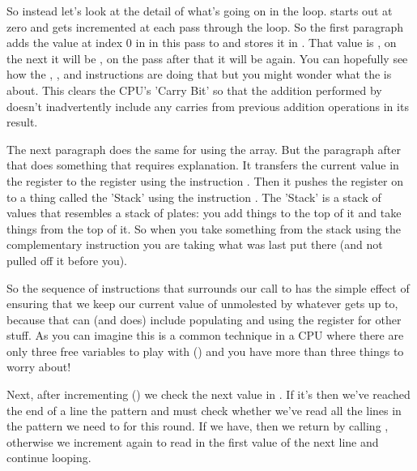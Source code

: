So instead let's look at the detail of what's going on in the loop.  starts out at zero and gets incremented at
each pass through the loop. So the first paragraph adds the value at index 0 in  in this pass to 
and stores it in . That value is , on the next it will be , on the pass after that
it will be  again. You can hopefully see how the , , and  instructions are doing that
but you might wonder what the  is about. This clears the CPU's 'Carry Bit' so that the addition performed by 
doesn't inadvertently include any carries from previous addition operations in its result.

The next paragraph does the same for  using the  array. But the paragraph after
that does something that requires explanation. It transfers the current value in the  register to the  register
using the instruction . Then it pushes the  register on to a thing called the 'Stack' using the instruction
. The 'Stack' is a stack of values that resembles a stack of plates: you add things to the top of it and take things
from the top of it. So when you take something from the stack using the complementary instruction  you are taking
what was last put there (and not pulled off it before you).

So the  sequence of instructions that surrounds our call to  has the
simple effect of ensuring that we keep our current value of  unmolested by whatever 
gets up to, because that can (and does) include populating and using the  register for other stuff. As you can imagine
this is a common technique in a CPU where there are only three free variables to play with () and you have more than three things
to worry about!

Next, after incrementing  () we check the next value in . If it's  then
we've reached the end of a line the pattern and must check whether we've read all the lines in the pattern we need to for this
round. If we have, then we return by calling , otherwise we increment  again to read
in the first value of the next line and continue looping.

